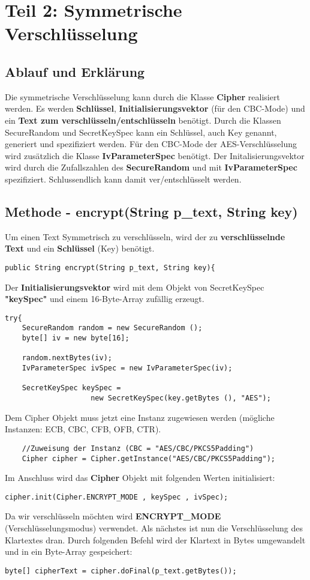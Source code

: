 \documentclass[12pt]{article}
\begin{document}
\section{Teil 2: Symmetrische Verschlüsselung}
\subsection{Ablauf und Erklärung}
Die symmetrische Verschlüsselung kann durch die Klasse \textbf{Cipher} realisiert werden. Es werden \textbf{Schlüssel}, \textbf{Initialisierungsvektor} (für den CBC-Mode) und ein \textbf{Text zum verschlüsseln/entschlüsseln} benötigt. Durch die Klassen SecureRandom und SecretKeySpec kann ein Schlüssel, auch Key genannt, generiert und spezifiziert werden. Für den CBC-Mode der AES-Verschlüsselung wird zusätzlich die Klasse \textbf{IvParameterSpec} benötigt. Der Initalisierungsvektor wird durch die Zufallszahlen des \textbf{SecureRandom} und mit \textbf{IvParameterSpec} spezifiziert. Schlussendlich kann damit ver/entschlüsselt werden.

\subsection{Methode - encrypt(String p\_text, String key)}
Um einen Text Symmetrisch zu verschlüsseln, wird der zu \textbf{verschlüsselnde Text} und ein \textbf{Schlüssel} (Key) benötigt.
\begin{lstlisting}
public String encrypt(String p_text, String key){
\end{lstlisting}
Der \textbf{Initialisierungsvektor} wird mit dem Objekt von SecretKeySpec \textbf{"keySpec"} und einem 16-Byte-Array zufällig erzeugt.
\begin{lstlisting}
try{
	SecureRandom random = new SecureRandom ();
	byte[] iv = new byte[16];
	
	random.nextBytes(iv);
	IvParameterSpec ivSpec = new IvParameterSpec(iv);
	
	SecretKeySpec keySpec = 
	                new SecretKeySpec(key.getBytes (), "AES");
\end{lstlisting}
Dem Cipher Objekt muss jetzt eine Instanz zugewiesen werden (mögliche Instanzen: ECB, CBC, CFB, OFB, CTR).
\begin{lstlisting}
    //Zuweisung der Instanz (CBC = "AES/CBC/PKCS5Padding")
	Cipher cipher = Cipher.getInstance("AES/CBC/PKCS5Padding");
\end{lstlisting}
Im Anschluss wird das \textbf{Cipher} Objekt mit folgenden Werten initialisiert:
\begin{lstlisting}
cipher.init(Cipher.ENCRYPT_MODE , keySpec , ivSpec);
\end{lstlisting}
Da wir verschlüsseln möchten wird \textbf{ENCRYPT\_MODE} (Verschlüsselungsmodus) verwendet.
Als nächstes ist nun die Verschlüsselung des Klartextes dran. Durch folgenden Befehl wird der Klartext in Bytes umgewandelt und in ein Byte-Array gespeichert:
\begin{lstlisting}
byte[] cipherText = cipher.doFinal(p_text.getBytes());
\end{lstlisting}
\newpage
\end{document}
